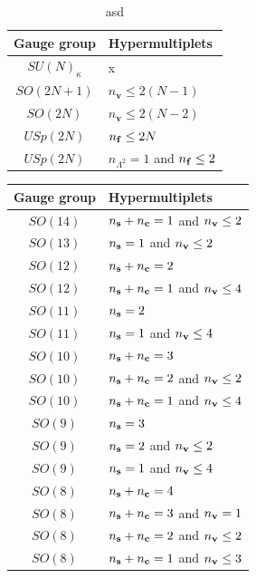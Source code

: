 \documentclass[letterpaper, 11pt]{article}
\begin{document}
{\begin{table}[tbp]
  \centering
  \begin{tabular}{@{}cl@{}}
    \toprule
    Gauge group  & Hypermultiplets    \\ \midrule
    $SU(N)_\kappa$ &x                               \\
    $SO(2N+1)$ & $n_{\mathbf{v}} \leq 2(N-1)$ \\
    $SO(2N)$   & $n_{\mathbf{v}} \leq 2(N-2)$ \\
    $USp(2N)$  & $n_{\bf f} \leq 2N$ \\
    $USp(2N)$  & $n_{\Lambda^2} = 1$ and $n_{\bf f} \leq 2$ \\ \bottomrule
    \end{tabular}
    \caption{asd}
    \label{tbl:infinite-theory}
\end{table}
\begin{table}[tbp]
  \centering
  \begin{tabular}{@{}cl@{}}
    \toprule
    Gauge group  & Hypermultiplets    \\  \midrule
    $SO(14)$  & $n_{\bf s} + n_{\bf c} = 1$ and $n_{\bf v}  \leq 2$ \\
    $SO(13)$  & $n_{\bf s} = 1$ and $n_{\bf v}  \leq 2$ \\
    $SO(12)$  & $n_{\bf s} + n_{\bf c} = 2$ \\
    $SO(12)$  & $n_{\bf s} + n_{\bf c} = 1$ and  $n_{\bf v}  \leq 4$\\
    $SO(11)$  & $n_{\bf s}= 2$ \\
    $SO(11)$  & $n_{\bf s}= 1$ and  $n_{\bf v}  \leq 4$\\
    $SO(10)$  & $n_{\bf s} + n_{\bf c} = 3$ \\
    $SO(10)$  & $n_{\bf s} + n_{\bf c} = 2$ and  $n_{\bf v}  \leq 2$\\
    $SO(10)$  & $n_{\bf s} + n_{\bf c} = 1$ and  $n_{\bf v}  \leq 4$\\
    $SO(9)$  & $n_{\bf s}  = 3$ \\
    $SO(9)$  & $n_{\bf s}  = 2$ and  $n_{\bf v}  \leq 2$\\
    $SO(9)$  & $n_{\bf s} = 1$ and  $n_{\bf v}  \leq 4$\\
    $SO(8)$  & $n_{\bf s} + n_{\bf c} = 4$ \\
    $SO(8)$  & $n_{\bf s} + n_{\bf c} = 3$ and  $n_{\bf v}  =1$\\
    $SO(8)$  & $n_{\bf s} + n_{\bf c} = 2$ and  $n_{\bf v}  \leq 2$\\
    $SO(8)$  & $n_{\bf s} + n_{\bf c} = 1$ and  $n_{\bf v}  \leq 3$\\

\end{tabular}
\end{table}}
\end{document}

